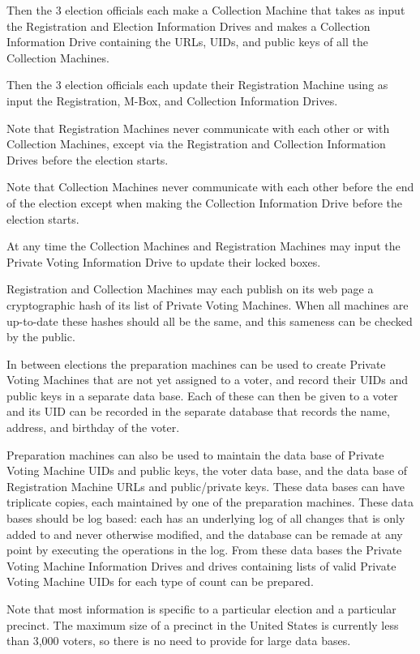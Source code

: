 \documentclass[12pt]{article}
\begin{document}
Then the 3 election officials each make a Collection Machine
that takes as input the Registration and Election Information Drives
and makes a Collection Information Drive containing
the URLs, UIDs, and public keys of all the Collection Machines.

Then the 3 election officials each update their Registration Machine
using as input the Registration, M-Box, and Collection
Information Drives.

Note that Registration Machines never communicate with each other
or with Collection Machines, except via the Registration and
Collection Information Drives before the election starts.

Note that Collection Machines never communicate with each other
before the end of the election
except when making the Collection Information Drive before the
election starts.

At any time the Collection Machines and Registration Machines
may input the Private Voting Information Drive to
update their locked boxes.

Registration and Collection Machines may each publish on its web page
a cryptographic hash of its list of Private Voting Machines.
When all machines are up-to-date
these hashes should all be the same, and this sameness
can be checked by the public.

In between elections the preparation machines can
be used to create Private Voting Machines that are not yet
assigned to a voter, and record their UIDs and public keys
in a separate data base.  Each of these can then be given to a voter
and its UID can be recorded in the separate database that records
the name, address, and birthday of the voter.

Preparation machines can also
be used to maintain the data base of Private Voting Machine
UIDs and public keys,
the voter data base, and the data base of
Registration Machine URLs and public/private keys.
These data bases can have triplicate copies, each maintained
by one of the preparation machines.  These data bases should
be log based: each has an underlying log of all changes
that is only added to and never otherwise modified,
and the database can be remade at any point by executing the
operations in the log.  From these data bases the Private
Voting Machine Information Drives and drives
containing lists of valid Private Voting Machine UIDs
for each type of count can be prepared.

Note that most information is specific to a particular election
and a particular precinct.  The maximum size of a precinct in
the United States is currently less than 3,000 voters, so there
is no need to provide for large data bases.
\end{document}
